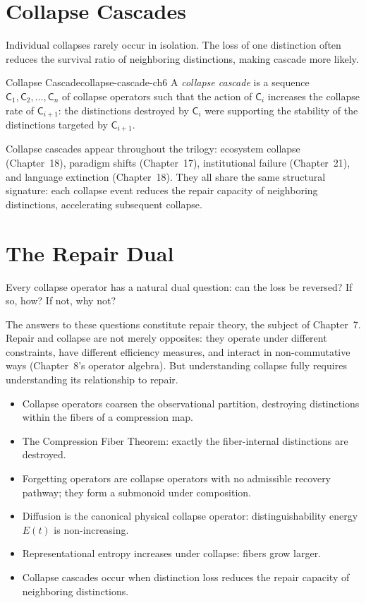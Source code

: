 \documentclass[12pt,twoside,openright]{book}
\newenvironment{chapsummary}{%
  \begin{tcolorbox}[colback=DistBlue!5,colframe=DistBlue,
    title={\faBookOpen\enspace Summary},
    fonttitle=\sffamily\bfseries\color{white},
    attach boxed title to top left={yshift=-2mm,xshift=4mm},
    boxed title style={colback=DistBlue,rounded corners}]
  \begin{itemize}[nosep,leftmargin=*]}{%
  \end{itemize}\end{tcolorbox}}
\providecommand{\collapOp}{\mathsf{C}}
\providecommand{\repEng}{E}
\begin{document}
\section{Collapse Cascades}

Individual collapses rarely occur in isolation. The loss of
one distinction often reduces the survival ratio of neighboring
distinctions, making cascade more likely.

\begin{definition}{Collapse Cascade}{collapse-cascade-ch6}
A \emph{collapse cascade} is a sequence
$\collapOp_1,\collapOp_2,\ldots,\collapOp_n$ of collapse
operators such that the action of $\collapOp_i$ increases
the collapse rate of $\collapOp_{i+1}$: the distinctions
destroyed by $\collapOp_i$ were supporting the stability
of the distinctions targeted by $\collapOp_{i+1}$.
\end{definition}

Collapse cascades appear throughout the trilogy: ecosystem
collapse (Chapter~18), paradigm shifts (Chapter~17),
institutional failure (Chapter~21), and language extinction
(Chapter~18). They all share the same structural signature:
each collapse event reduces the repair capacity of neighboring
distinctions, accelerating subsequent collapse.

\section{The Repair Dual}

Every collapse operator has a natural dual question: can the
loss be reversed? If so, how? If not, why not?

The answers to these questions constitute repair theory, the
subject of Chapter~7. Repair and collapse are not merely
opposites: they operate under different constraints, have
different efficiency measures, and interact in non-commutative
ways (Chapter~8's operator algebra). But understanding collapse
fully requires understanding its relationship to repair.

\begin{chapsummary}
\item Collapse operators coarsen the observational partition,
  destroying distinctions within the fibers of a compression
  map.
\item The Compression Fiber Theorem: exactly the fiber-internal
  distinctions are destroyed.
\item Forgetting operators are collapse operators with no
  admissible recovery pathway; they form a submonoid under
  composition.
\item Diffusion is the canonical physical collapse operator:
  distinguishability energy $\repEng(t)$ is non-increasing.
\item Representational entropy increases under collapse:
  fibers grow larger.
\item Collapse cascades occur when distinction loss reduces
  the repair capacity of neighboring distinctions.
\end{chapsummary}
\end{document}
